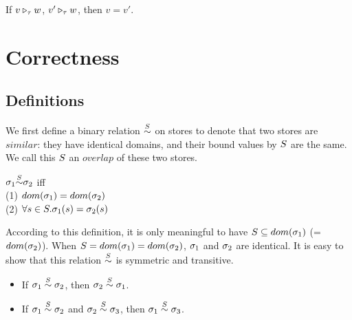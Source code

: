 \begin{comment}
\PT{
\AC{\ValRep {\lrange{v_1}{v_k}} {\tau} {\v}}
\UC{\ValRep {\Seqk{v}}{\tseq{\tau}}{(\v,\langle \F_1,..., \F_k, \T \rangle)}}
}\\[4ex]

\item \Jug{\ValRep{\lrange{v_1}{v_k}}{\tau}{\v}}
\PT{
\Axiom{\ValRep{\lrange{n_1}{n_k}}{\int}{\vrange{n_1}{n_k}}}
}
\PT{
\AC{\ValRep{v_i}{\tau}{\v}}
\UC{\ValRep{\lrange{v_1}{v_k}}{\tseq{\tau}}{}}
}

\end{comment}



\begin{lem}
	If $\ValRep{v}{\tau}{w}$, $\ValRep{v'}{\tau}{w}$,
	then $v=v'$.
\end{lem}



\section{Correctness}

\subsection{Definitions}
We first define a binary relation $\~\S$ on stores to denote that two stores are $similar$: they have identical domains, and their bound values by $\S$ are the same. 
We call this $\S$ an $overlap$ of these two stores.

\begin{defi}
	\label{def-sgm-sim}
	
	$\sgm_1 {\~{\S}} \sgm_2 $
	iff \\
	(1) $dom(\sgm_1) = dom(\sgm_2)$ \\
	(2) $\forall s \in \S.\sgm_1(s)= \sgm_2(s)$ \\
\end{defi}

According to this definition, it is only meaningful to have $\S  \subseteq dom(\sgm_1)$ (= $dom(\sgm_2)$).  
When $\S = dom(\sgm_1) = dom(\sgm_2)$, $\sgm_1$ and $\sgm_2$ are identical. 
It is easy to show that this relation $\overset{\S}{\sim}$ is symmetric and transitive.
\begin{itemize}
	\item If $\sgm_1 \~\S \sgm_2$, then $\sgm_2 \~\S \sgm_1$.
	\item If $\sgm_1 \~\S \sgm_2$ and $\sgm_2 \~\S \sgm_3$, then $\sgm_1 \~\S \sgm_3$.
\end{itemize}


